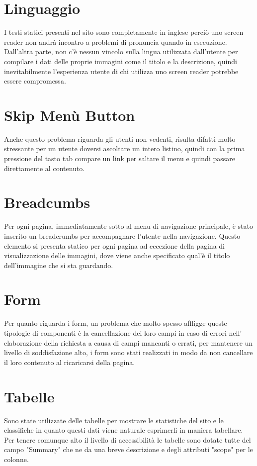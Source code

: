 \documentclass[openany, a4paper, 12pt]{report}
\begin{document}
		\section{Linguaggio}
		I testi statici presenti nel sito sono completamente in inglese perciò uno screen reader non andrà incontro a problemi di pronuncia quando in esecuzione. Dall'altra parte, non c'è nessun vincolo sulla lingua utilizzata dall'utente per compilare i dati delle proprie immagini come il titolo e la descrizione, quindi inevitabilmente l'esperienza utente di chi utilizza uno screen reader potrebbe essere compromessa.
		\section{Skip Menù Button}
		Anche questo problema riguarda gli utenti non vedenti, risulta difatti molto stressante per un utente doversi ascoltare un intero listino, quindi con la prima pressione del tasto tab compare un link per saltare il menu e quindi passare direttamente al contenuto.
		\section{Breadcumbs}
		Per ogni pagina, immediatamente sotto al menu di navigazione principale, è stato inserito un breadcrumbs per accompagnare l'utente nella navigazione. Questo elemento si presenta statico per ogni pagina ad eccezione della pagina di visualizzazione delle immagini, dove viene anche specificato qual'è il titolo dell'immagine che si sta guardando.
		\section{Form}
	Per quanto riguarda i form, un problema che molto spesso afﬂigge queste tipologie di componenti è la cancellazione dei loro campi in caso di errori nell' elaborazione della richiesta a causa di campi mancanti o errati, per mantenere un livello di soddisfazione alto, i form sono stati realizzati in modo da non cancellare il loro contenuto al ricaricarsi della pagina.
		\section{Tabelle}
		Sono state utilizzate delle tabelle per mostrare le statistiche del sito e le classifiche in quanto questi dati viene naturale esprimerli in maniera tabellare. Per tenere comunque alto il livello di accessibilità le tabelle sono dotate tutte del campo "Summary" che ne da una breve descrizione e degli attributi "scope" per le colonne.
\end{document}
